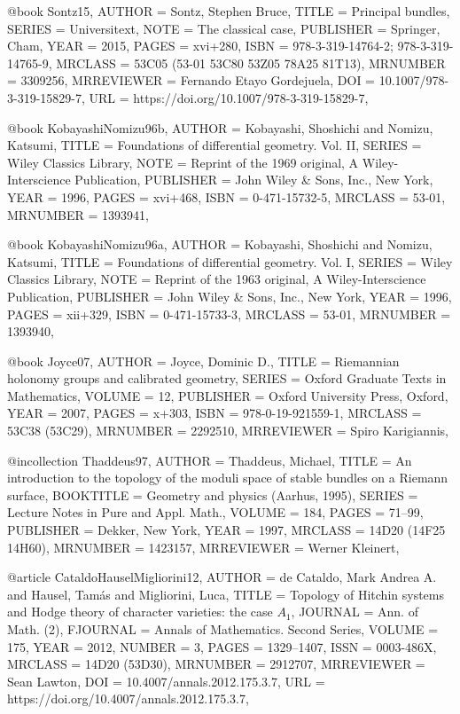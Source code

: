 @book {Sontz15,
    AUTHOR = {Sontz, Stephen Bruce},
     TITLE = {Principal bundles},
    SERIES = {Universitext},
      NOTE = {The classical case},
 PUBLISHER = {Springer, Cham},
      YEAR = {2015},
     PAGES = {xvi+280},
      ISBN = {978-3-319-14764-2; 978-3-319-14765-9},
   MRCLASS = {53C05 (53-01 53C80 53Z05 78A25 81T13)},
  MRNUMBER = {3309256},
MRREVIEWER = {Fernando Etayo Gordejuela},
       DOI = {10.1007/978-3-319-15829-7},
       URL = {https://doi.org/10.1007/978-3-319-15829-7},
}

@book {KobayashiNomizu96b,
    AUTHOR = {Kobayashi, Shoshichi and Nomizu, Katsumi},
     TITLE = {Foundations of differential geometry. {V}ol. {II}},
    SERIES = {Wiley Classics Library},
      NOTE = {Reprint of the 1969 original,
              A Wiley-Interscience Publication},
 PUBLISHER = {John Wiley \& Sons, Inc., New York},
      YEAR = {1996},
     PAGES = {xvi+468},
      ISBN = {0-471-15732-5},
   MRCLASS = {53-01},
  MRNUMBER = {1393941},
}
    
@book {KobayashiNomizu96a,
    AUTHOR = {Kobayashi, Shoshichi and Nomizu, Katsumi},
     TITLE = {Foundations of differential geometry. {V}ol. {I}},
    SERIES = {Wiley Classics Library},
      NOTE = {Reprint of the 1963 original,
              A Wiley-Interscience Publication},
 PUBLISHER = {John Wiley \& Sons, Inc., New York},
      YEAR = {1996},
     PAGES = {xii+329},
      ISBN = {0-471-15733-3},
   MRCLASS = {53-01},
  MRNUMBER = {1393940},
}

@book {Joyce07,
    AUTHOR = {Joyce, Dominic D.},
     TITLE = {Riemannian holonomy groups and calibrated geometry},
    SERIES = {Oxford Graduate Texts in Mathematics},
    VOLUME = {12},
 PUBLISHER = {Oxford University Press, Oxford},
      YEAR = {2007},
     PAGES = {x+303},
      ISBN = {978-0-19-921559-1},
   MRCLASS = {53C38 (53C29)},
  MRNUMBER = {2292510},
MRREVIEWER = {Spiro Karigiannis},
}

@incollection {Thaddeus97,
    AUTHOR = {Thaddeus, Michael},
     TITLE = {An introduction to the topology of the moduli space of stable
              bundles on a {R}iemann surface},
 BOOKTITLE = {Geometry and physics ({A}arhus, 1995)},
    SERIES = {Lecture Notes in Pure and Appl. Math.},
    VOLUME = {184},
     PAGES = {71--99},
 PUBLISHER = {Dekker, New York},
      YEAR = {1997},
   MRCLASS = {14D20 (14F25 14H60)},
  MRNUMBER = {1423157},
MRREVIEWER = {Werner Kleinert},
}

@article {CataldoHauselMigliorini12,
    AUTHOR = {de Cataldo, Mark Andrea A. and Hausel, Tam\'{a}s and Migliorini,
              Luca},
     TITLE = {Topology of {H}itchin systems and {H}odge theory of character
              varieties: the case {$A_1$}},
   JOURNAL = {Ann. of Math. (2)},
  FJOURNAL = {Annals of Mathematics. Second Series},
    VOLUME = {175},
      YEAR = {2012},
    NUMBER = {3},
     PAGES = {1329--1407},
      ISSN = {0003-486X},
   MRCLASS = {14D20 (53D30)},
  MRNUMBER = {2912707},
MRREVIEWER = {Sean Lawton},
       DOI = {10.4007/annals.2012.175.3.7},
       URL = {https://doi.org/10.4007/annals.2012.175.3.7},
}

